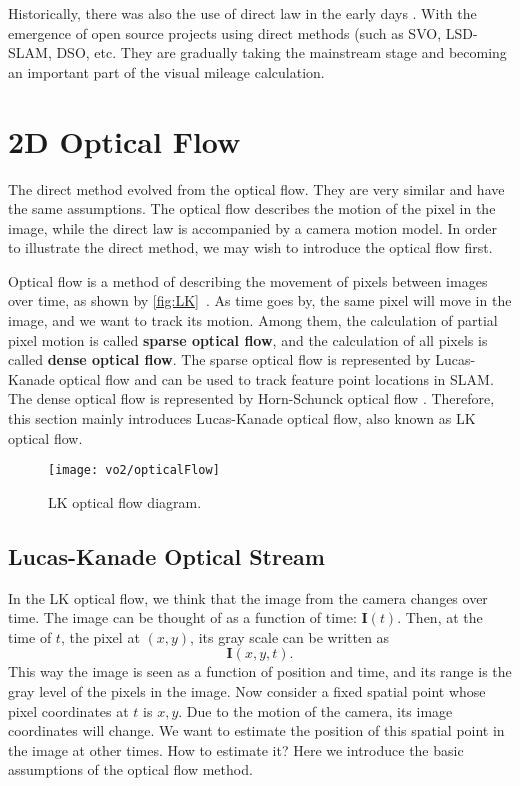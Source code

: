 Historically, there was also the use of direct law in the early days \textsuperscript{\cite{Silveira2008}}. With the emergence of open source projects using direct methods (such as SVO\textsuperscript{\cite{Forster2014}}, LSD-SLAM\textsuperscript{\cite{Engel2014}}, DSO\textsuperscript{\cite{Engel2016}}, etc. They are gradually taking the mainstream stage and becoming an important part of the visual mileage calculation.

\section{2D Optical Flow}
The direct method evolved from the optical flow. They are very similar and have the same assumptions. The optical flow describes the motion of the pixel in the image, while the direct law is accompanied by a camera motion model. In order to illustrate the direct method, we may wish to introduce the optical flow first.

Optical flow is a method of describing the movement of pixels between images over time, as shown by \autoref{fig:LK}~. As time goes by, the same pixel will move in the image, and we want to track its motion. Among them, the calculation of partial pixel motion is called \textbf{sparse optical flow}, and the calculation of all pixels is called \textbf{dense optical flow}. The sparse optical flow is represented by Lucas-Kanade optical flow \textsuperscript{\cite{Lucas1981}} and can be used to track feature point locations in SLAM. The dense optical flow is represented by Horn-Schunck optical flow \textsuperscript{\cite{Horn1981}}. Therefore, this section mainly introduces Lucas-Kanade optical flow, also known as LK optical flow.

\begin{figure}[!htp]
\centering
\texttt{[image: vo2/opticalFlow]}
\caption{LK optical flow diagram. }
\label{fig:LK}
\end{figure}

\subsection*{Lucas-Kanade Optical Stream}
In the LK optical flow, we think that the image from the camera changes over time. The image can be thought of as a function of time: $\bm{I}(t)$. Then, at the time of $t$, the pixel at $(x,y)$, its gray scale can be written as
\[
\bm{I}(x,y,t).
\]
This way the image is seen as a function of position and time, and its range is the gray level of the pixels in the image. Now consider a fixed spatial point whose pixel coordinates at $t$ is $x,y$. Due to the motion of the camera, its image coordinates will change. We want to estimate the position of this spatial point in the image at other times. How to estimate it? Here we introduce the basic assumptions of the optical flow method.

